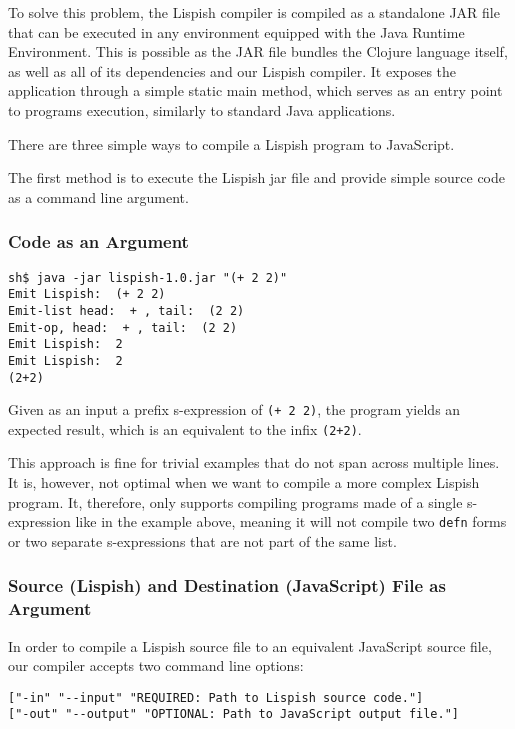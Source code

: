 To solve this problem, the Lispish compiler is compiled as a standalone JAR file that can be executed in any environment equipped with the Java Runtime Environment. This is possible as the JAR file bundles the Clojure language itself, as well as all of its dependencies and our Lispish compiler. It exposes the application through a simple static main method, which serves as an entry point to programs execution, similarly to standard Java applications. 

There are three simple ways to compile a Lispish program to JavaScript. 

The first method is to execute the Lispish jar file and provide simple source code as a command line argument.

\subsubsection{Code as an Argument}

\begin{verbatim}
sh$ java -jar lispish-1.0.jar "(+ 2 2)"
Emit Lispish:  (+ 2 2)
Emit-list head:  + , tail:  (2 2)
Emit-op, head:  + , tail:  (2 2)
Emit Lispish:  2
Emit Lispish:  2
(2+2)
\end{verbatim}

Given as an input a prefix s-expression of \texttt{(+ 2 2)}, the program yields an expected result, which is an equivalent to the infix \texttt{(2+2)}.

This approach is fine for trivial examples that do not span across multiple lines. It is, however, not optimal when we want to compile a more complex Lispish program.
It, therefore, only supports compiling programs made of a single s-expression like in the example above, meaning it will not compile two \texttt{defn} forms or two separate s-expressions that are not part of the same list. 

\subsubsection{Source (Lispish) and Destination (JavaScript) File as Argument}

In order to compile a Lispish source file to an equivalent JavaScript source file, our compiler accepts two command line options:

\begin{verbatim}
["-in" "--input" "REQUIRED: Path to Lispish source code."]
["-out" "--output" "OPTIONAL: Path to JavaScript output file."]
\end{verbatim}

